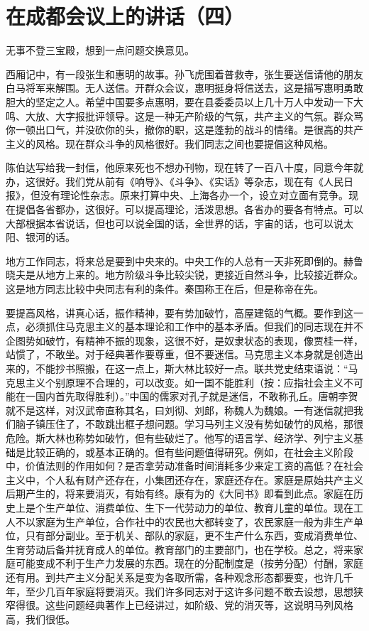 \section[在成都会议上的讲话（四）（一九五八年三月二十二日）]{在成都会议上的讲话（四）}


无事不登三宝殿，想到一点问题交换意见。

西厢记中，有一段张生和惠明的故事。孙飞虎围着普救寺，张生要送信请他的朋友白马将军来解围。无人送信。开群众会议，惠明挺身将信送去，这是描写惠明勇敢胆大的坚定之人。希望中国要多点惠明，要在县委委员以上几十万人中发动一下大鸣、大放、大字报批评领导。这是一种无产阶级的气氛，共产主义的气氛。群众骂你一顿出口气，并没砍你的头，撤你的职，这是蓬勃的战斗的情绪。是很高的共产主义的风格。现在群众斗争的风格很好。我们同志之间也要提倡这种风格。

陈伯达写给我一封信，他原来死也不想办刊物，现在转了一百八十度，同意今年就办，这很好。我们党从前有《响导》、《斗争》、《实话》等杂志，现在有《人民日报》，但没有理论性杂志。原来打算中央、上海各办一个，设立对立面有竞争。现在提倡各省都办，这很好。可以提高理论，活泼思想。各省办的要各有特点。可以大部根据本省说话，但也可以说全国的话，全世界的话，宇宙的话，也可以说太阳、银河的话。

地方工作同志，将来总是要到中央来的。中央工作的人总有一天非死即倒的。赫鲁晓夫是从地方上来的。地方阶级斗争比较尖锐，更接近自然斗争，比较接近群众。这是地方同志比较中央同志有利的条件。秦国称王在后，但是称帝在先。

要提高风格，讲真心话，振作精神，要有势加破竹，高屋建瓴的气概。要作到这一点，必须抓住马克思主义的基本理论和工作中的基本矛盾。但我们的同志现在并不企图势如破竹，有精神不振的现象，这很不好，是奴隶状态的表现，像贾桂一样，站惯了，不敢坐。对于经典著作要尊重，但不要迷信。马克思主义本身就是创造出来的，不能抄书照搬，在这一点上，斯大林比较好一点。联共党史结束语说：“马克思主义个别原理不合理的，可以改变。如一国不能胜利（按：应指社会主义不可能在一国内首先取得胜利）。”中国的儒家对孔子就是迷信，不敢称孔丘。唐朝李贺就不是这样，对汉武帝直称其名，曰刘彻、刘郎，称魏人为魏娘。一有迷信就把我们脑子镇压住了，不敢跳出框子想问题。学习马列主义没有势如破竹的风格，那很危险。斯大林也称势如破竹，但有些破烂了。他写的语言学、经济学、列宁主义基础是比较正确的，或基本正确的。但有些问题值得研究。例如，在社会主义阶段中，价值法则的作用如何？是否拿劳动准备时间消耗多少来定工资的高低？在社会主义中，个人私有财产还存在，小集团还存在，家庭还存在。家庭是原始共产主义后期产生的，将来要消灭，有始有终。康有为的《大同书》即看到此点。家庭在历史上是个生产单位、消费单位、生下一代劳动力的单位、教育儿童的单位。现在工人不以家庭为生产单位，合作社中的农民也大都转变了，农民家庭一般为非生产单位，只有部分副业。至于机关、部队的家庭，更不生产什么东西，变成消费单位、生育劳动后备并抚育成人的单位。教育部门的主要部门，也在学校。总之，将来家庭可能变成不利于生产力发展的东西。现在的分配制度是（按劳分配）付酬，家庭还有用。到共产主义分配关系是变为各取所需，各种观念形态都要变，也许几千年，至少几百年家庭将要消灭。我们许多同志对于这许多问题不敢去设想，思想狭窄得很。这些问题经典著作上已经讲过，如阶级、党的消灭等，这说明马列风格高，我们很低。

